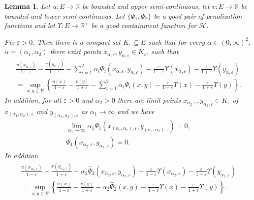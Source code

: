 \documentclass[a4paper]{article}
\newcommand{\cH}{\mathcal{H}}
\newcommand{\bR}{\mathbb{R}}
\numberwithin{equation}{section}
\newtheorem{lemma}[theorem]{Lemma}
\theoremstyle{definition}
\begin{document}
\begin{lemma} \label{lemma:consecutive_limit_points}
	Let $u : E \rightarrow \bR$ be bounded and upper semi-continuous, let $v : E \rightarrow \bR$ be bounded and lower semi-continuous. Let $\{\Psi_1,\Psi_2\}$ be a good pair of penalization functions and let $\Upsilon : E \rightarrow \bR^+$ be a good containment function for $\cH$.
	
	\smallskip
	
	Fix $\varepsilon > 0$. Then there is a compact set $K_\varepsilon \subseteq E$ such that for every $\alpha \in (0,\infty)^2$, $\alpha = (\alpha_1,\alpha_2)$ there exist points $x_{\alpha,\varepsilon},y_{\alpha,\varepsilon} \in K_\varepsilon$, such that
	\begin{multline*}
		\frac{u(x_{\alpha,\varepsilon})}{1-\varepsilon} - \frac{v(y_{\alpha,\varepsilon})}{1+\varepsilon} - \sum_{i=1}^2  \alpha_i\Psi_i(x_{\alpha,\varepsilon},y_{\alpha,\varepsilon}) - \frac{\varepsilon}{1-\varepsilon}\Upsilon(x_{\alpha,\varepsilon}) -\frac{\varepsilon}{1+\varepsilon}\Upsilon(y_{\alpha,\varepsilon}) \\
		= \sup_{x,y \in E} \left\{\frac{u(x)}{1-\varepsilon} - \frac{v(y)}{1+\varepsilon} -  \sum_{i = 1}^2 \alpha_i \Psi_i(x,y)  - \frac{\varepsilon}{1-\varepsilon}\Upsilon(x) - \frac{\varepsilon}{1+\varepsilon}\Upsilon(y)\right\}.
	\end{multline*}
	In addition, for all $\varepsilon > 0$ and $\alpha_2 > 0$ there are limit points $x_{\alpha_{2},\varepsilon}, y_{\alpha_2,\varepsilon} \in K_\varepsilon$ of $x_{(\alpha_1,\alpha_2),\varepsilon}$ and $y_{(\alpha_1,\alpha_2),\varepsilon}$ as $\alpha_{1}\rightarrow \infty$ and we have 
	\begin{gather*}
		\lim_{\alpha_1 \rightarrow \infty}\alpha_1 \Psi_1(x_{(\alpha_{1},\alpha_2),\varepsilon},y_{(\alpha_{1},\alpha_2),\varepsilon}) = 0, \\
		\Psi_1(x_{\alpha_2,\varepsilon},y_{\alpha_2,\varepsilon}) = 0. 
	\end{gather*}
	In addition
	\begin{multline*}
		\frac{u(x_{\alpha_2,\varepsilon})}{1-\varepsilon} - \frac{v(y_{\alpha_2,\varepsilon})}{1+\varepsilon} - \alpha_2\widehat{\Psi}_2 (x_{\alpha_2,\varepsilon},y_{\alpha_2,\varepsilon}) 	- \frac{\varepsilon}{1-\varepsilon}\Upsilon(x_{\alpha_2,\varepsilon}) -\frac{\varepsilon}{1+\varepsilon}\Upsilon(y_{\alpha_2,\varepsilon}) \\
		= \sup_{x,y \in E} \left\{\frac{u(x)}{1-\varepsilon} - \frac{v(y)}{1+\varepsilon} -  \alpha_2\widehat{\Psi}_2(x,y)  - \frac{\varepsilon}{1-\varepsilon}\Upsilon(x) - \frac{\varepsilon}{1+\varepsilon}\Upsilon(y)\right\}.
	\end{multline*}
\end{lemma}
\end{document}
